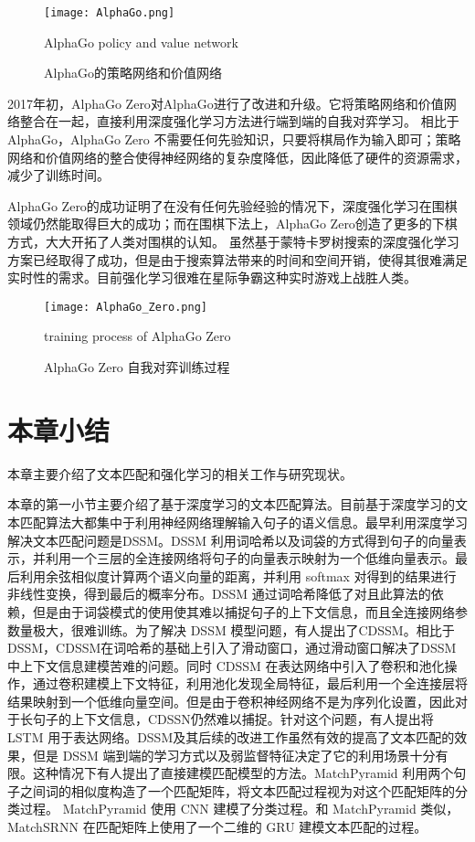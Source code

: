 \begin{figure}[!htbp]\centering
  \texttt{[image: AlphaGo.png]}
  \caption{AlphaGo的策略网络和价值网络} {AlphaGo policy and value network}
  \label{fig:AlphaGo}       %
\end{figure}

2017年初，AlphaGo Zero\cite{Silver2017MasteringTG}对AlphaGo进行了改进和升级。它将策略网络和价值网络整合在一起，直接利用深度强化学习方法进行端到端的自我对弈学习。
相比于 AlphaGo，AlphaGo Zero 不需要任何先验知识，只要将棋局作为输入即可；策略网络和价值网络的整合使得神经网络的复杂度降低，因此降低了硬件的资源需求，减少了训练时间。

AlphaGo Zero的成功证明了在没有任何先验经验的情况下，深度强化学习在围棋领域仍然能取得巨大的成功；而在围棋下法上，AlphaGo Zero创造了更多的下棋方式，大大开拓了人类对围棋的认知。
虽然基于蒙特卡罗树搜索的深度强化学习方案已经取得了成功，但是由于搜索算法带来的时间和空间开销，使得其很难满足实时性的需求。目前强化学习很难在星际争霸这种实时游戏上战胜人类。

\begin{figure}[!htbp]\centering
  \texttt{[image: AlphaGo\_Zero.png]}
  \caption{AlphaGo Zero 自我对弈训练过程} {training process of AlphaGo Zero}
  \label{fig:AlphaGo_Zero}       %
\end{figure}

\section{本章小结}

本章主要介绍了文本匹配和强化学习的相关工作与研究现状。

本章的第一小节主要介绍了基于深度学习的文本匹配算法。目前基于深度学习的文本匹配算法大都集中于利用神经网络理解输入句子的语义信息。最早利用深度学习解决文本匹配问题是DSSM。DSSM 利用词哈希以及词袋的方式得到句子的向量表示，并利用一个三层的全连接网络将句子的向量表示映射为一个低维向量表示。最后利用余弦相似度计算两个语义向量的距离，并利用 softmax 对得到的结果进行非线性变换，得到最后的概率分布。DSSM 通过词哈希降低了对且此算法的依赖，但是由于词袋模式的使用使其难以捕捉句子的上下文信息，而且全连接网络参数量极大，很难训练。为了解决 DSSM 模型问题，有人提出了CDSSM。相比于DSSM，CDSSM在词哈希的基础上引入了滑动窗口，通过滑动窗口解决了DSSM中上下文信息建模苦难的问题。同时 CDSSM 在表达网络中引入了卷积和池化操作，通过卷积建模上下文特征，利用池化发现全局特征，最后利用一个全连接层将结果映射到一个低维向量空间。但是由于卷积神经网络不是为序列化设置，因此对于长句子的上下文信息，CDSSN仍然难以捕捉。针对这个问题，有人提出将 LSTM 用于表达网络。DSSM及其后续的改进工作虽然有效的提高了文本匹配的效果，但是 DSSM 端到端的学习方式以及弱监督特征决定了它的利用场景十分有限。这种情况下有人提出了直接建模匹配模型的方法。MatchPyramid 利用两个句子之间词的相似度构造了一个匹配矩阵，将文本匹配过程视为对这个匹配矩阵的分类过程。 MatchPyramid 使用 CNN 建模了分类过程。和 MatchPyramid 类似， MatchSRNN 在匹配矩阵上使用了一个二维的 GRU 建模文本匹配的过程。

